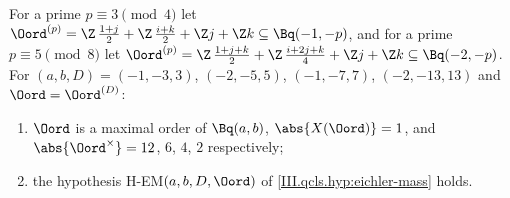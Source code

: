 For a prime $p\equiv3\pmod4$ let $\Oord^{(p)}=\Z\,\tfrac{1+j}2+\Z\,\tfrac{i+k}2+\Z j+\Z k\subseteq\Bq(-1,-p)$, and for a prime
$p\equiv5\pmod8$ let $\Oord^{(p)}=\Z\,\tfrac{1+j+k}2+\Z\,\tfrac{i+2j+k}4+\Z j+\Z k\subseteq\Bq(-2,-p)$. For $(a,b,D)=(-1,-3,3)$, $(-2,-5,5)$,
$(-1,-7,7)$, $(-2,-13,13)$ and $\Oord=\Oord^{(D)}$:
\begin{enumerate}[label=(\alph*)]
\item $\Oord$ is a maximal order of $\Bq(a,b)$, $\abs{X(\Oord)}=1$, and $\abs{\Oord^\times}=12$, $6$, $4$, $2$ respectively;
\item the hypothesis H-EM$(a,b,D,\Oord)$ of \cref{III.qcls.hyp:eichler-mass} holds.
\end{enumerate}
